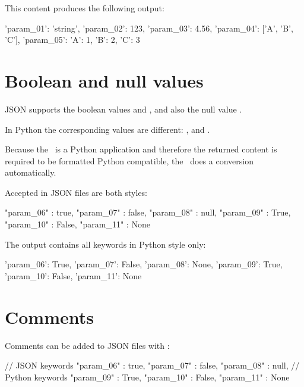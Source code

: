 This content produces the following output:

\begin{pythonlog}
{'param_01': 'string',
 'param_02': 123,
 'param_03': 4.56,
 'param_04': ['A', 'B', 'C'],
 'param_05': {'A': 1, 'B': 2, 'C': 3}}
\end{pythonlog}


\newpage

\section{Boolean and null values}

JSON supports the boolean values  and , and also the null value .

In Python the corresponding values are different: ,  and .

Because the \pkg\ is a Python application and therefore the returned content is required to be formatted Python compatible,
the \pkg\ does a conversion automatically.

Accepted in JSON files are both styles:

\begin{pythoncode}
{
   "param_06" : true,
   "param_07" : false,
   "param_08" : null,
   "param_09" : True,
   "param_10" : False,
   "param_11" : None
}
\end{pythoncode}

The output contains all keywords in Python style only:

\begin{pythonlog}
{'param_06': True,
 'param_07': False,
 'param_08': None,
 'param_09': True,
 'param_10': False,
 'param_11': None}
\end{pythonlog}



\newpage

\section{Comments}

Comments can be added to JSON files with \pcode{//}:

\begin{pythoncode}
{
   // JSON keywords
   "param_06" : true,
   "param_07" : false,
   "param_08" : null,
   // Python keywords
   "param_09" : True,
   "param_10" : False,
   "param_11" : None
}
\end{pythoncode}

